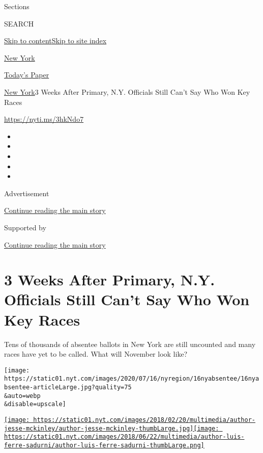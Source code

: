 Sections

SEARCH

\protect\hyperlink{site-content}{Skip to
content}\protect\hyperlink{site-index}{Skip to site index}

\href{https://www.nytimes.com/section/nyregion}{New York}

\href{https://myaccount.nytimes.com/auth/login?response_type=cookie\&client_id=vi}{}

\href{https://www.nytimes.com/section/todayspaper}{Today's Paper}

\href{/section/nyregion}{New York}\textbar{}3 Weeks After Primary, N.Y.
Officials Still Can't Say Who Won Key Races

\url{https://nyti.ms/3hkNdo7}

\begin{itemize}
\item
\item
\item
\item
\item
\end{itemize}

Advertisement

\protect\hyperlink{after-top}{Continue reading the main story}

Supported by

\protect\hyperlink{after-sponsor}{Continue reading the main story}

\hypertarget{3-weeks-after-primary-ny-officials-still-cant-say-who-won-key-races}{%
\section{3 Weeks After Primary, N.Y. Officials Still Can't Say Who Won
Key
Races}\label{3-weeks-after-primary-ny-officials-still-cant-say-who-won-key-races}}

Tens of thousands of absentee ballots in New York are still uncounted
and many races have yet to be called. What will November look like?

\texttt{[image: https://static01.nyt.com/images/2020/07/16/nyregion/16nyabsentee/16nyabsentee-articleLarge.jpg?quality=75\\\&auto=webp\\\&disable=upscale]}

\href{https://www.nytimes.com/by/jesse-mckinley}{\texttt{[image: https://static01.nyt.com/images/2018/02/20/multimedia/author-jesse-mckinley/author-jesse-mckinley-thumbLarge.jpg]}}\href{https://www.nytimes.com/by/luis-ferre-sadurni}{\texttt{[image: https://static01.nyt.com/images/2018/06/22/multimedia/author-luis-ferre-sadurni/author-luis-ferre-sadurni-thumbLarge.png]}}


